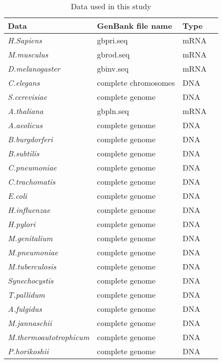 \begin{table}
\begin{center}
\begin{tabular}{|l|l|l|l|}
\hline
Data                & GenBank file name & Type \\
\hline
\hline
{\it H.Sapiens}     & gbpri.seq         & mRNA \\
{\it M.musculus}    & gbrod.seq         & mRNA \\
{\it D.melanogaster} & gbinv.seq        & mRNA\\
{\it C.elegans}     & complete chromosomes & DNA \\
{\it S.cerevisiae}  & complete genome   & DNA \\
{\it A.thaliana}    & gbpln.seq         & mRNA \\
\hline
{\it A.aeolicus}    & complete genome   & DNA \\
{\it B.burgdorferi} & complete genome   & DNA \\
{\it B.subtilis}    & complete genome   & DNA \\
{\it C.pneumoniae}  & complete genome   & DNA \\
{\it C.trachomatis} & complete genome   & DNA \\
{\it E.coli}        & complete genome   & DNA \\
{\it H.influenzae}  & complete genome   & DNA \\
{\it H.pylori}      & complete genome   & DNA \\
{\it M.genitalium}  & complete genome   & DNA \\
{\it M.pneumoniae}  & complete genome   & DNA \\
{\it M.tuberculosis} & complete genome   & DNA \\
{\it Synechocystis} & complete genome   & DNA \\
{\it T.pallidum}    & complete genome   & DNA \\
\hline
{\it A.fulgidus} & complete genome   & DNA \\
{\it M.jannaschii} & complete genome   & DNA \\
{\it M.thermoautotrophicum} & complete genome   & DNA \\
{\it P.horikoshii} & complete genome   & DNA \\
\hline
\end{tabular}\\
\end{center}
\caption{Data used in this study}
\label{ob_data}
\end{table}

